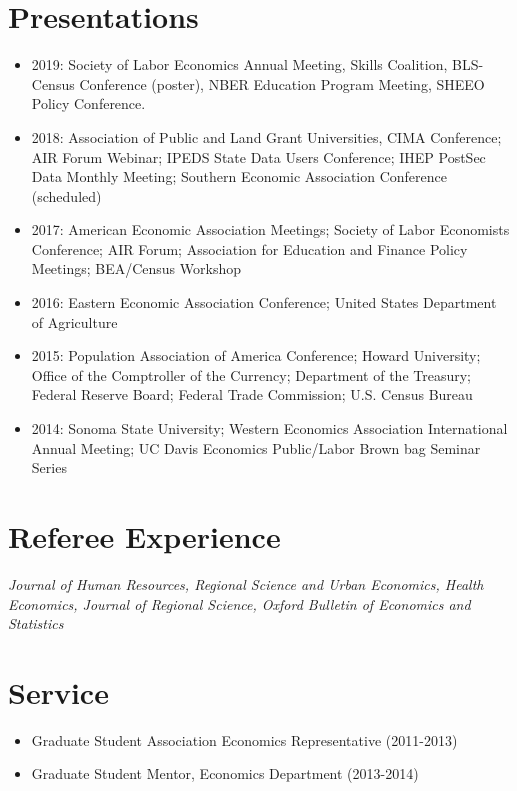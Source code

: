 \documentclass[margin,line]{res}
\begin{document}
\begin{resume}

\section{\sc Presentations}

\begin{itemize}
 \setlength{\itemsep}{0cm}%
  \setlength{\parskip}{0cm}%
	\item 2019: Society of Labor Economics Annual Meeting, Skills Coalition, BLS-Census Conference (poster), NBER Education Program Meeting, SHEEO Policy Conference.
	\item 2018: Association of Public and Land Grant Universities, CIMA Conference; AIR Forum Webinar; IPEDS State Data Users Conference; IHEP PostSec Data Monthly Meeting; Southern Economic Association Conference (scheduled)
	\item 2017: American Economic Association Meetings; Society of Labor Economists Conference; AIR Forum; Association for Education and Finance Policy Meetings; BEA/Census Workshop
	\item 2016: Eastern Economic Association Conference; United States Department of Agriculture
	\item 2015: Population Association of America Conference; Howard University; Office of the Comptroller of the Currency; Department of the Treasury; Federal Reserve Board; Federal Trade Commission; U.S. Census Bureau
	\item 2014: Sonoma State University; Western Economics Association International Annual Meeting; UC Davis Economics Public/Labor Brown bag Seminar Series
\end{itemize}


\section{\sc Referee Experience}

\textit{Journal of Human Resources, Regional Science and Urban Economics, Health Economics, Journal of Regional Science, Oxford Bulletin of Economics and Statistics}
\vspace{.02in}
\section{\sc Service}

\begin{itemize}
 \setlength{\itemsep}{0cm}%
  \setlength{\parskip}{0cm}%
	\item Graduate Student Association Economics Representative (2011-2013)
	\item Graduate Student Mentor, Economics Department (2013-2014)
\end{itemize}


\end{resume}
\end{document}
